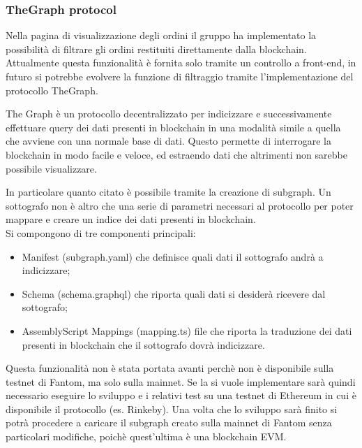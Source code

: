 

\subsubsection{TheGraph protocol}

Nella pagina di visualizzazione degli ordini il gruppo ha implementato la possibilità di filtrare gli ordini restituiti direttamente dalla blockchain. Attualmente questa funzionalità è fornita solo tramite un controllo a front-end, in futuro si potrebbe evolvere la funzione di filtraggio tramite l'implementazione del protocollo TheGraph\glo.

The Graph è un protocollo decentralizzato per indicizzare e successivamente effettuare query dei dati presenti in blockchain in una modalità simile a quella che avviene con una normale base di dati. Questo permette di interrogare la blockchain in modo facile e veloce, ed estraendo dati che altrimenti non sarebbe possibile visualizzare.

In particolare quanto citato è possibile tramite la creazione di subgraph. Un sottografo non è altro che una serie di parametri necessari al protocollo per poter mappare e creare un indice dei dati presenti in blockchain.\\
Si compongono di tre componenti principali:

\begin{itemize}
 \item Manifest (subgraph.yaml) che definisce quali dati il sottografo andrà a indicizzare;


 \item Schema (schema.graphql) che riporta quali dati si desiderà ricevere dal sottografo;


 \item AssemblyScript Mappings (mapping.ts) file che riporta la traduzione dei dati presenti in blockchain che il sottografo dovrà indicizzare.

\end{itemize}

Questa funzionalità non è stata portata avanti perchè non è disponibile sulla testnet di Fantom, ma solo sulla mainnet. Se la si vuole implementare sarà quindi necessario eseguire lo sviluppo e i relativi test su una testnet di Ethereum in cui è disponibile il protocollo (es. Rinkeby\glo). Una volta che lo sviluppo sarà finito si potrà procedere a caricare il subgraph creato sulla mainnet di Fantom senza particolari modifiche, poichè quest'ultima è una blockchain EVM.


